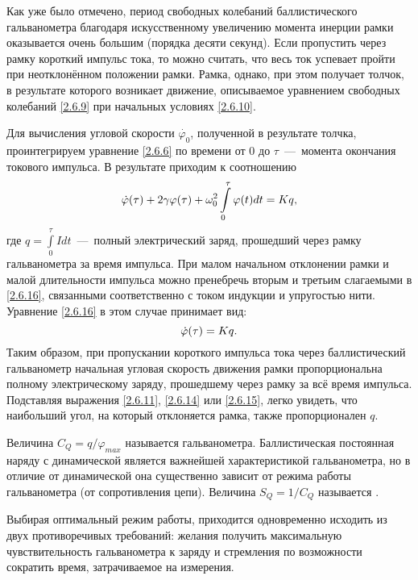 Как уже было отмечено, период свободных
колебаний баллистического гальванометра благодаря искусственному
увеличению момента инерции рамки оказывается очень большим (порядка
десяти секунд). Если пропустить через рамку короткий импульс тока, то
можно считать, что весь ток успевает пройти при неотклонённом положении
рамки. Рамка, однако, при этом получает толчок, в результате которого
возникает движение, описываемое уравнением свободных колебаний \eqref{2.6.9} при
начальных условиях \eqref{2.6.10}.

Для вычисления угловой скорости $\dot{\varphi_0}$, полученной в результате толчка,
проинтегрируем уравнение \eqref{2.6.6} по времени от $0$ до $\tau$~---~момента окончания
токового импульса. В результате приходим к соотношению
\begin{equation}
	\eqmark{2.6.17}
	 \dot\varphi(\tau) + 2\gamma\varphi(\tau) + \omega_0^2 \int\limits_0^\tau \varphi(t) dt = Kq,
\end{equation}
где $q = \int\limits_0^\tau I dt$~---~полный электрический заряд, прошедший через рамку гальванометра за
время импульса. При малом начальном отклонении рамки и малой
длительности импульса можно пренебречь вторым и третьим слагаемыми в
\eqref{2.6.16}, связанными соответственно с током индукции и упругостью нити.
Уравнение \eqref{2.6.16} в этом случае принимает вид:
\begin{equation}
	\eqmark{2.6.18}
	 \dot\varphi(\tau) = Kq.
\end{equation}
Таким образом, при пропускании короткого импульса тока через
баллистический гальванометр начальная угловая скорость движения рамки
пропорциональна полному электрическому заряду, прошедшему через рамку за
всё время импульса. Подставляя выражения \eqref{2.6.11}, \eqref{2.6.14} или \eqref{2.6.15}, легко
увидеть, что наибольший угол, на который отклоняется рамка, также
пропорционален $q$.

Величина $C_Q = q/\varphi_{max}$ называется  гальванометра.
Баллистическая постоянная наряду с динамической является важнейшей
характеристикой гальванометра, но в отличие от динамической она
существенно зависит от режима работы гальванометра (от сопротивления
цепи). Величина $S_Q = 1/C_Q$ называется .

Выбирая оптимальный режим работы, приходится одновременно исходить из
двух противоречивых требований: желания получить максимальную
чувствительность гальванометра к заряду и стремления по возможности
сократить время, затрачиваемое на измерения.

